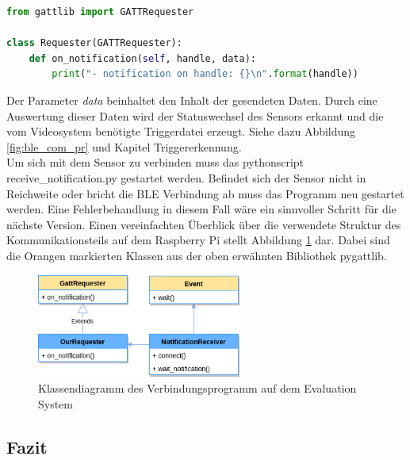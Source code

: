 \begin{lstlisting}[language=Python, caption=pygattlib: Receive notifications example, label=lst:pygattlib_ex]
  from gattlib import GATTRequester

class Requester(GATTRequester):
    def on_notification(self, handle, data):
        print("- notification on handle: {}\n".format(handle))
\end{lstlisting}

Der Parameter \textit{data} beinhaltet den Inhalt der gesendeten Daten. Durch eine Auswertung dieser Daten wird der Statuswechsel des Sensors erkannt und die vom Videosystem benötigte Triggerdatei erzeugt. Siehe dazu Abbildung \ref{fig:ble_com_pr} und Kapitel  Triggererkennung. \\

Um sich mit dem Sensor zu verbinden muss das pythonscript receive\_notification.py gestartet werden. Befindet sich der Sensor nicht in Reichweite oder bricht die BLE Verbindung ab muss das Programm neu gestartet werden. Eine Fehlerbehandlung in diesem Fall wäre ein sinnvoller Schritt für die nächste Version. Einen vereinfachten Überblick über die verwendete Struktur des Kommunikationsteils auf dem Raspberry Pi stellt Abbildung \ref{fig:classdiagram_connection} dar. Dabei sind die Orangen markierten Klassen aus der oben erwähnten Bibliothek pygattlib.

\begin{figure}[h]
  \centering
  \includegraphics[width=0.6\textwidth]{includes/kom/graphics/gatt_classDiagram2}
  \caption{Klassendiagramm des Verbindungsprogramm auf dem Evaluation System}
  \label{fig:classdiagram_connection}
\end{figure}


\subsection{Fazit}
